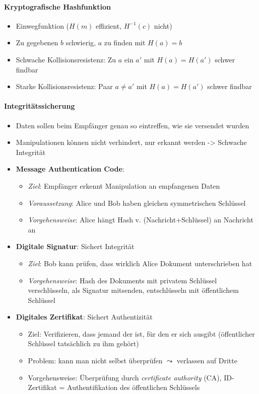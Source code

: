 \paragraph{Kryptografische Hashfunktion}
\begin{itemize}
	\item Einwegfunktion (\( H(m) \) effizient, \( H^{-1}(c) \) nicht)
	\item Zu gegebenen \( b \) schwierig, \( a \) zu finden mit \( H(a) = b \)
	\item Schwache Kollisionsresistenz: Zu \( a \) ein \( a' \) mit \( H(a) = H(a') \) schwer findbar
	\item Starke Kollisionsresistenz: Paar \( a \neq a' \) mit \( H(a) = H(a') \) schwer findbar
\end{itemize}

\paragraph{Integritätssicherung}
\begin{itemize}
	\item Daten sollen beim Empfänger genau so eintreffen, wie sie versendet wurden
	\item Manipulationen können nicht verhindert, nur erkannt werden -> Schwache Integrität
	\item \textbf{Message Authentication Code}:
	\begin{itemize}
    \item \emph{Ziel}: Empfänger erkennt Manipulation an empfangenen Daten
    \item \emph{Voraussetzung}: Alice und Bob haben gleichen symmetrischen Schlüssel
    \item \emph{Vorgehensweise}: Alice hängt Hash v. (Nachricht+Schlüssel) an Nachricht an
  \end{itemize}
	\item \textbf{Digitale Signatur}: Sichert Integrität
	\begin{itemize}
    \item \emph{Ziel}: Bob kann prüfen, dass wirklich Alice Dokument unterschrieben hat
    \item \emph{Vorgehensweise}: Hash des Dokuments mit privatem Schlüssel verschlüsseln, als Signatur mitsenden, entschlüsseln mit öffentlichem Schlüssel
  \end{itemize}
	\item \textbf{Digitales Zertifikat}: Sichert Authentizität
	\begin{itemize}
    \item Ziel: Verifizieren, dass jemand der ist, für den er sich ausgibt (öffentlicher Schlüssel tatsächlich zu ihm gehört)
    \item Problem: kann man nicht selbst überprüfen \( \leadsto \) verlassen auf Dritte
    \item Vorgehensweise: Überprüfung durch \emph{certificate authority} (CA), ID-Zertifikat = Authentifikation des öffentlichen Schlüssels
  \end{itemize}
\end{itemize}

